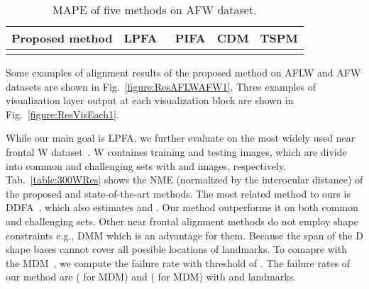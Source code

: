 \begin{table}[t!]\small
\caption{MAPE of five methods on AFW dataset.}
\begin{center}
\begin{tabular}{ c|c|c|c|c } 
 \hline
 Proposed method & LPFA~\cite{jourabloo2016large} & PIFA & CDM & TSPM \\ 
 \hline
  &  &  &  &  \\
 \hline  
\end{tabular}
\end{center}
\label{table:AFWRes}\vspace{-9mm}
\end{table}
Some examples of alignment results of the proposed method on AFLW and AFW datasets are shown in Fig.~\ref{figure:ResAFLWAFW1}. Three examples of visualization layer output at each visualization block are shown in Fig.~\ref{figure:ResVisEach1}. 

\vspace{-2mm}
\vspace{-2mm}
While our main goal is LPFA, we further evaluate on the most widely used near frontal W dataset~\cite{sagonas2013300}. W containes  training and  testing images, which are divide into common and challenging sets with  and  images, respectively. 
Tab.~\ref{table:300WRes} shows the NME (normalized by the interocular distance) of the proposed and state-of-the-art methods. The most related method to ours is DDFA~\cite{zhu2015face}, which also estimates  and . 
Our method outperforms it on both common and challenging sets. Other near frontal alignment methods do not employ shape constraints e.g., DMM which is an advantage for them. Because the span of the D shape bases cannot cover all possible locations of landmarks. 
To comapre with the MDM~\cite{trigeorgis2016mnemonic}, we compute the failure rate with threshold of . The failure rates of our method are  ( for MDM) and  ( for MDM) with  and  landmarks. 

